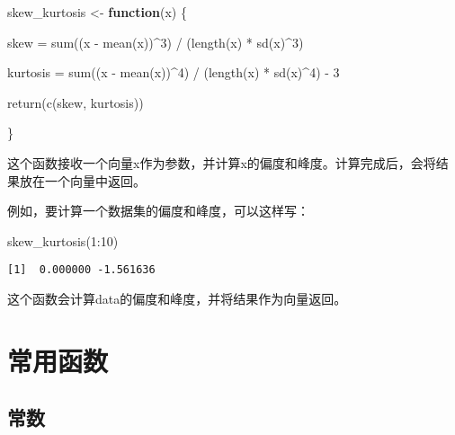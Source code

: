 \documentclass[
  letterpaper,
  DIV=11,
  numbers=noendperiod]{scrreprt}
\newenvironment{Shaded}{\begin{snugshade}}{\end{snugshade}}
\newcommand{\ControlFlowTok}[1]{\textcolor[rgb]{0.00,0.23,0.31}{\textbf{#1}}}
\newcommand{\DecValTok}[1]{\textcolor[rgb]{0.68,0.00,0.00}{#1}}
\newcommand{\FunctionTok}[1]{\textcolor[rgb]{0.28,0.35,0.67}{#1}}
\newcommand{\NormalTok}[1]{\textcolor[rgb]{0.00,0.23,0.31}{#1}}
\newcommand{\OtherTok}[1]{\textcolor[rgb]{0.00,0.23,0.31}{#1}}
\newcommand{\SpecialCharTok}[1]{\textcolor[rgb]{0.37,0.37,0.37}{#1}}
\begin{document}
\begin{Shaded}
\begin{Highlighting}[]
\NormalTok{skew\_kurtosis }\OtherTok{\textless{}{-}} \ControlFlowTok{function}\NormalTok{(x) \{}

\NormalTok{  skew }\OtherTok{=} \FunctionTok{sum}\NormalTok{((x }\SpecialCharTok{{-}} \FunctionTok{mean}\NormalTok{(x))}\SpecialCharTok{\^{}}\DecValTok{3}\NormalTok{) }\SpecialCharTok{/}\NormalTok{ (}\FunctionTok{length}\NormalTok{(x) }\SpecialCharTok{*} \FunctionTok{sd}\NormalTok{(x)}\SpecialCharTok{\^{}}\DecValTok{3}\NormalTok{)}

\NormalTok{  kurtosis }\OtherTok{=} \FunctionTok{sum}\NormalTok{((x }\SpecialCharTok{{-}} \FunctionTok{mean}\NormalTok{(x))}\SpecialCharTok{\^{}}\DecValTok{4}\NormalTok{) }\SpecialCharTok{/}\NormalTok{ (}\FunctionTok{length}\NormalTok{(x) }\SpecialCharTok{*} \FunctionTok{sd}\NormalTok{(x)}\SpecialCharTok{\^{}}\DecValTok{4}\NormalTok{) }\SpecialCharTok{{-}} \DecValTok{3}

  \FunctionTok{return}\NormalTok{(}\FunctionTok{c}\NormalTok{(skew, kurtosis))}

\NormalTok{\}}
\end{Highlighting}
\end{Shaded}

这个函数接收一个向量x作为参数，并计算x的偏度和峰度。计算完成后，会将结果放在一个向量中返回。

例如，要计算一个数据集的偏度和峰度，可以这样写：

\begin{Shaded}
\begin{Highlighting}[]
  \FunctionTok{skew\_kurtosis}\NormalTok{(}\DecValTok{1}\SpecialCharTok{:}\DecValTok{10}\NormalTok{)}
\end{Highlighting}
\end{Shaded}

\begin{verbatim}
[1]  0.000000 -1.561636
\end{verbatim}

这个函数会计算data的偏度和峰度，并将结果作为向量返回。

\chapter{常用函数}\label{ux5e38ux7528ux51fdux6570}

\section{常数}\label{ux5e38ux6570}
\end{document}
